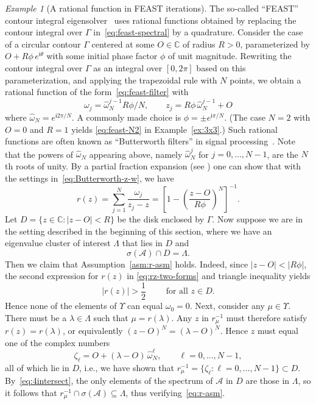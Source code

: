 \documentclass[12pt, oneside, reqno]{amsart}
\theoremstyle{remark}
\newtheorem{example}[theorem]{Example}
\newcommand{\ii}{\mathfrak{i}}
\renewcommand{\hat}{\widehat}
\newcommand{\CC}{\mathbb{C}}
\newcommand{\nquad}{N}
\newcommand{\vL}{\varLambda}
\newcommand{\vU}{\varUpsilon}
\newcommand{\vG}{\varGamma}
\newcommand{\Ac}{\mathcal{A}}
\newcommand{\og}{\omega}
\begin{document}
\begin{example}[A rational function in FEAST
  iterations] \label{ex:Butterworth} The so-called ``FEAST'' contour integral
  eigensolver~\cite{Pol2009-1,GopGruOva2020-1} uses rational functions
  obtained by replacing the contour integral over $\vG$
  in~\eqref{eq:feast-spectral} by a quadrature. Consider the case of a
  circular contour $\vG$ centered at some $O \in \CC$ of radius $R>0$,
  parameterized by $O + R \phi\,e^{\ii \theta}$ with some initial
  phase factor $\phi$ of unit magnitude.
  Rewriting the contour integral over $\vG$ as an integral over $[0, 2\pi]$ 
  based on this parameterization,  and applying
  the trapezoidal rule with $N$ points, we obtain a rational function of
  the form~\eqref{eq:feast-filter} with
  \begin{equation}
    \label{eq:Butterworth-z-w}
    \og_j = \hat\og_N^{j-1} R \phi/N, \qquad z_j = R \phi\,\hat\og_N^{j-1} + O
  \end{equation}
  where $\hat\og_N = e^{\ii 2 \pi/N}$. A commonly made choice is
  $\phi = \pm e^{\ii \pi/N}.$ (The case  $N=2$ with $O=0$ and $R=1$ yields
  \eqref{eq:feast-N2} in Example~\ref{ex:3x3}.)  
  Such rational functions are often known
  as ``Butterworth filters'' in signal processing~\cite{Ham1998-1}.
  Note that the powers of $\hat \og_N$ appearing above, namely
  $\hat\og_N^j$ for $j = 0, \dots, N-1$, are the $N$th roots of
  unity. By a partial fraction expansion (see
  \cite[Example~2.2]{GopGruOva2020-1}) one can show that with the
  settings in~\eqref{eq:Butterworth-z-w}, we have
  \begin{equation}
    \label{eq:rz-two-forms}
    r(z) =  \sum_{j=1}^\nquad 
    \frac{\omega_j}{z_j - z} =
    \left[1 - \left( \frac{z - O}{R\phi} \right)^N   \right]^{-1}.
  \end{equation}
  Let $D = \{ z \in \CC: | z - O | < R \}$ be the disk enclosed by
  $\vG$. Now suppose we are in the setting described in the beginning
  of this section, where we have an eigenvalue cluster of interest
  $\vL$ that lies in $D$ and
  \begin{equation}
    \label{eq:4intersect}
    \sigma(\Ac) \cap D = \vL. 
  \end{equation}
  Then we claim that Assumption~\ref{asm:r-asm} holds. Indeed, since
  $|z - O| < |R \phi|$, the second expression for $r(z)$ in
  \eqref{eq:rz-two-forms} and triangle inequality yields
  \[
    |r(z)| > \frac 1 2 \qquad \text{ for all } z \in D.
  \]
  Hence none of the elements of  $\vU$ can equal $\og_0 =0$. Next, consider 
  any $\mu \in \vU$. There must be a $\lambda \in \vL$
  such that $\mu = r(\lambda)$. Any $z $ in $r_{\mu}^{-1}$ must therefore 
  satisfy $r(z) = r(\lambda)$, or equivalently
  $(z - O)^N = (\lambda - O)^N$. Hence $z$ must equal one of the
  complex numbers
  \[
    \zeta_\ell = O +  (\lambda - O)\, \hat\og_N^\ell,
    \qquad
    \ell=0, \ldots, N-1,
  \]
  all of which lie in $D$, i.e., we have shown that
  $r_\mu^{-1} = \{ \zeta_\ell: \ell=0, \ldots, N-1\} \subset
  D$. By~\eqref{eq:4intersect}, the only elements of the spectrum of
  $\Ac$ in $D$ are those in $\vL$, so  it follows that
  $r_\mu^{-1} \cap \sigma(\Ac) \subseteq \vL$, thus
  verifying~\eqref{eq:r-asm}.
\end{example}
\end{document}
